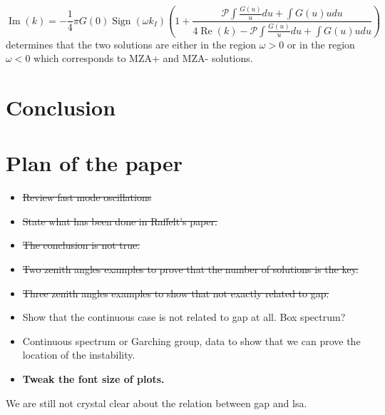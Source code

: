 \documentclass[%
preprint,
 amsmath,amssymb,
 aps,
 prd
]{revtex4-1}
\begin{document}
\begin{equation}
   \operatorname{Im}(k) = - \frac{1}{4} \pi G(0) \operatorname{Sign}(\omega k_I) \left(  1 + \frac{ \mathscr P \int \frac{G(u)}{u} du + \int G(u) u du }{ 4 \operatorname{Re}(k) - \mathscr P \int \frac{G(u)}{u} du + \int G(u) u du }  \right)
\end{equation}
determines that the two solutions are either in the region $\omega>0$ or in the region $\omega<0$ which corresponds to MZA+ and MZA- solutions.



\section{\label{sec-conclusion}Conclusion}





















\appendix
\section{\label{sec-outline}Plan of the paper}



\begin{itemize}
    \item \sout{Review fast mode oscillations}
    \item \sout{State what has been done in Raffelt's paper.}
    \item \sout{The conclusion is not true.}
    \item \sout{Two zenith angles examples to prove that the number of solutions is the key.}
    \item \sout{Three zenith angles examples to show that not exactly related to gap.}
    \item Show that the continuous case is not related to gap at all. Box spectrum?
    \item Continuous spectrum or Garching group, data to show that we can prove the location of the instability.
    \item {\color{red}\bf Tweak the font size of plots.}
\end{itemize}



We are still not crystal clear about the relation between gap and lsa.







\end{document}
